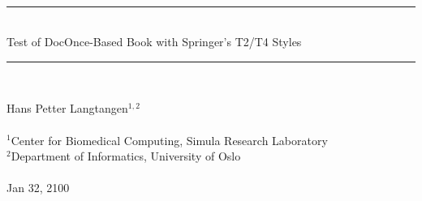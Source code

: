 \documentclass[graybox,sectrefs,envcountresetchap,open=right,final]{svmonodo}
\begin{document}
\newcommand{\exercisesection}[1]{\subsection*{#1}}

\frontmatter
\setcounter{page}{3}
\pagestyle{headings}
\thispagestyle{empty}
\hbox{\ \ }
\vfill
\begin{center}
{\huge{\bfseries{
\begin{spacing}{1.25}
{\rule{\linewidth}{0.5mm}} \\[0.4cm]
{Test of DocOnce-Based Book with Springer's T2/T4 Styles}
\\[0.4cm] {\rule{\linewidth}{0.5mm}} \\[1.5cm]
\end{spacing}
}}}
\vspace{0.5cm}
{\Large\textsf{Hans Petter Langtangen${}^{1, 2}$}}\\ [3mm]
\ \\ [2mm]
{\large\textsf{${}^1$Center for Biomedical Computing, Simula Research Laboratory} \\ [1.5mm]}
{\large\textsf{${}^2$Department of Informatics, University of Oslo} \\ [1.5mm]}
\ \\ [10mm]
{\large\textsf{Jan 32, 2100}}
\end{center}
\vfill
\clearpage
\setpagesize
\end{document}
